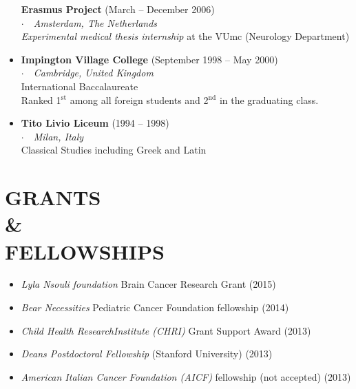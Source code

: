\documentclass[line,margin]{res}
\newcommand{\superscript}[1]{\ensuremath{^{\textrm{#1}}}}
\newcommand{\titlestyle}[1]{{\bf #1}}
\newcommand{\placestyle}[1]{\footnotesize $\cdot$\ \ {\emph{#1}}}
\newcommand{\datestyle}[1]{{\tiny \dotfill} {\small (#1)}}
\begin{document}
\begin{resume}
\begin{itemize}
{  \titlestyle{Erasmus Project} \datestyle{March -- December 2006} \\
  { \placestyle{Amsterdam, The Netherlands} } \\
  \emph{Experimental medical thesis internship} at the VUmc (Neurology Department)
}
\item {
  \titlestyle{Impington Village College} \datestyle{September 1998 -- May 2000} \\
  { \placestyle{Cambridge, United Kingdom} } \\
  International Baccalaureate \\
  Ranked 1\superscript{st} among all foreign students and 2\superscript{nd} in the graduating class.
}
\item {
  \titlestyle{Tito Livio Liceum} \datestyle{1994 -- 1998} \\
  { \placestyle{Milan, Italy} } \\
  Classical Studies including Greek and Latin
}
\end{itemize}

\newpage
\section{GRANTS \\ \& \\ FELLOWSHIPS}
\begin{itemize}
  \item \emph{Lyla Nsouli foundation} Brain Cancer Research Grant \datestyle{2015}
  \item \emph{Bear Necessities} Pediatric Cancer Foundation fellowship \datestyle{2014}
  \item \emph{Child Health ResearchInstitute (CHRI)} Grant Support Award \datestyle{2013}
  \item \emph{Deans Postdoctoral Fellowship} (Stanford University) \datestyle{2013}
  \item \emph{American Italian Cancer Foundation (AICF)} fellowship (not accepted) \datestyle{2013}
\end{itemize}


\end{resume}
\end{document}

